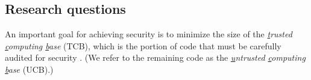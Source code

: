 %



\begin{refsection}


\renewcommand{\t}[1]{\texttt{#1}}
\newcommand{\TCB}[1]{\textsf{TCB}(#1)}
\newcommand{\diff}[2]{\textsf{diff}(#1,#2)}

\newcommand{\viF}  {V1-FIO}
\newcommand{\viN}  {V1-NoFIO}
\newcommand{\viiF} {V2-FIO}
\newcommand{\viiN} {V2-NoFIO}
\newcommand{\viiNm}{V2-NoFIO-minTCB}

\newcommand{\emphasize}[1]{{\color{red}\underline{#1}}}

\newenvironment{fbstart}
  {\VerbatimEnvironment\[\begin{minipage}{\textwidth}\begin{verbatim}}
  {\end{verbatim}\end{minipage}\]}
\newenvironment{fb}
  {\VerbatimEnvironment\[\begin{minipage}{\textwidth}\begin{verbatim}}
  {\end{verbatim}\end{minipage}\]}


\section{Research questions}

An important goal for achieving security is to minimize the size of the \textit{\underline{t}rusted \underline{c}omputing \underline{b}ase} (TCB),
which is the portion of code that must be carefully audited for security \cite{schroeder1975engineering}.
%
(We refer to the remaining code as the \textit{\underline{u}ntrusted \underline{c}omputing \underline{b}ase} (UCB).)


\end{refsection}
